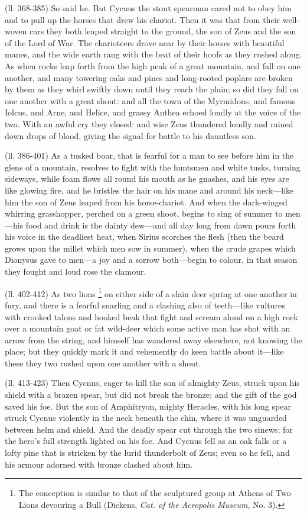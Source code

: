 (ll. 368-385) So said he. But Cycnus the stout spearman cared not to obey him
and to pull up the horses that drew his chariot. Then it was that from their
well-woven cars they both leaped straight to the ground, the son of Zeus and
the son of the Lord of War. The charioteers drove near by their horses with
beautiful manes, and the wide earth rang with the beat of their hoofs as they
rushed along. As when rocks leap forth from the high peak of a great mountain,
and fall on one another, and many towering oaks and pines and long-rooted
poplars are broken by them as they whirl swiftly down until they reach the
plain; so did they fall on one another with a great shout: and all the town of
the Myrmidons, and famous Iolcus, and Arne, and Helice, and grassy Anthea
echoed loudly at the voice of the two. With an awful cry they closed: and wise
Zeus thundered loudly and rained down drops of blood, giving the signal for
battle to his dauntless son.

(ll. 386-401) As a tusked boar, that is fearful for a man to see before him in
the glens of a mountain, resolves to fight with the huntsmen and white tusks,
turning sideways, while foam flows all round his mouth as he gnashes, and his
eyes are like glowing fire, and he bristles the hair on his mane and around his
neck—like him the son of Zeus leaped from his horse-chariot. And when the
dark-winged whirring grasshopper, perched on a green shoot, begins to sing of
summer to men—his food and drink is the dainty dew—and all day long
from dawn pours forth his voice in the deadliest heat, when Sirius scorches the
flesh (then the beard grows upon the millet which men sow in summer), when the
crude grapes which Dionysus gave to men—a joy and a sorrow
both—begin to colour, in that season they fought and loud rose the
clamour.

(ll. 402-412) As two lions \footnote{The conception is similar
to that of the sculptured group at Athens of Two Lions devouring a Bull
(Dickens, \emph{Cat. of the Acropolis Museum}, No. 3).} on either side of a slain deer
spring at one another in fury, and there is a fearful snarling and a clashing
also of teeth—like vultures with crooked talons and hooked beak that
fight and scream aloud on a high rock over a mountain goat or fat wild-deer
which some active man has shot with an arrow from the string, and himself has
wandered away elsewhere, not knowing the place; but they quickly mark it and
vehemently do keen battle about it—like these they two rushed upon one
another with a shout.

(ll. 413-423) Then Cycnus, eager to kill the son of almighty Zeus, struck upon
his shield with a brazen spear, but did not break the bronze; and the gift of
the god saved his foe. But the son of Amphitryon, mighty Heracles, with his
long spear struck Cycnus violently in the neck beneath the chin, where it was
unguarded between helm and shield. And the deadly spear cut through the two
sinews; for the hero’s full strength lighted on his foe. And Cycnus fell
as an oak falls or a lofty pine that is stricken by the lurid thunderbolt of
Zeus; even so he fell, and his armour adorned with bronze clashed about him.

